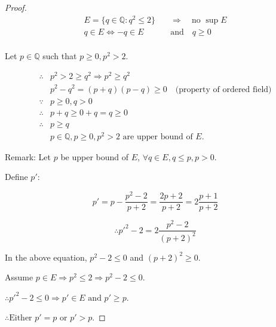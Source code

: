 \documentclass{article}
\begin{document}
    \begin{proof}
        \begin{align*}
            E = \{ q \in \mathbb{Q} : q^{2} \leq 2 \} \quad &\Rightarrow \quad  \text{no } \sup E \\
            q \in E \Leftrightarrow - q \in E \quad &\text{and} \quad q \geq 0 \\
        \end{align*}
            
        Let $p \in \mathbb{Q}$ such that $p \geq 0, p^{2} > 2$.
            
        \begin{align*}
            \therefore &p^{2} > 2 \geq q^{2} \Rightarrow p^{2} \geq q^{2} \\
                            &p^{2} - q^{2} = (p + q)(p - q) \geq 0 \quad \text{(property of ordered field)} \\
            \because  &p \geq 0, q > 0 \\
            \therefore &p + q \geq 0 + q = q \geq 0 \\
            \therefore &p \geq q \\
                            &p \in \mathbb{Q}, p \geq 0, p^{2} > 2 \text{ are upper bound of } E.
        \end{align*}

        Remark: Let $p$ be upper bound of $E$, $\forall q \in E, q \leq p, p > 0$.
        
        Define $p'$:
        
        \begin{displaymath}
            p' = p - \frac{p^{2} - 2}{p + 2} = \frac{2p + 2}{p + 2} = 2\frac{p + 1}{p + 2}
        \end{displaymath}
        
        \begin{displaymath}
            \therefore p'^{2} - 2 = 2\frac{p^{2} - 2}{(p + 2)^{2}}
        \end{displaymath}
        
        In the above equation, $p^{2} - 2 \leq 0$ and $(p + 2)^{2} \geq 0$.
        
        Assume $p \in E \Rightarrow p^{2} \leq 2 \Rightarrow p^{2} - 2 \leq 0$.
        
        $\therefore p'^{2} - 2 \leq 0 \Rightarrow p' \in E \text{ and } p' \geq p$.
        
        $\therefore \text{Either } p' = p \text{ or } p' > p$.
        

\end{proof}
\end{document}
